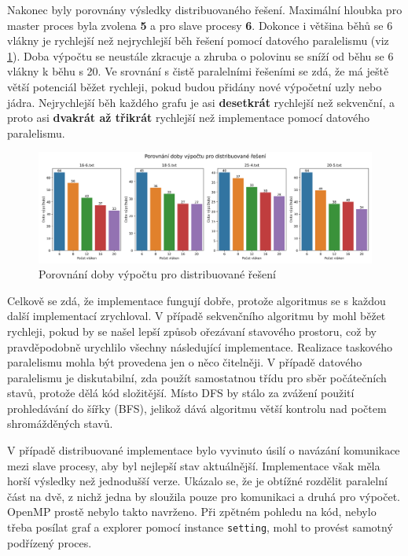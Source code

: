 Nakonec byly porovnány výsledky distribuovaného řešení.
Maximální hloubka pro master proces byla zvolena \textbf{5} a pro slave procesy \textbf{6}.
Dokonce i většina běhů se 6 vlákny je rychlejší než nejrychlejší běh řešení pomocí datového paralelismu (viz \ref{fig:distrib-graph.png}).
Doba výpočtu se neustále zkracuje a zhruba o polovinu se sníží od běhu se 6 vlákny k běhu s 20.
Ve srovnání s čistě paralelními řešeními se zdá, že má ještě větší potenciál běžet rychleji, pokud budou přidány nové výpočetní uzly nebo jádra.
Nejrychlejší běh každého grafu je asi \textbf{desetkrát} rychlejší než sekvenční, a proto asi \textbf{dvakrát až třikrát} rychlejší než implementace pomocí datového paralelismu.

\begin{figure}[!htbp]
\centerline{\includegraphics[scale=0.52]{report/images/distrib-graph.png}}
\caption{Porovnání doby výpočtu pro distribuované řešení}
\label{fig:distrib-graph.png}
\end{figure}
\FloatBarrier

Celkově se zdá, že implementace fungují dobře, protože algoritmus se s každou další implementací zrychloval.
V případě sekvenčního algoritmu by mohl běžet rychleji, pokud by se našel lepší způsob ořezávaní stavového prostoru, což by pravděpodobně urychlilo všechny následující implementace.
Realizace taskového paralelismu mohla být provedena jen o něco čitelněji.
V případě datového paralelismu je diskutabilní, zda použít samostatnou třídu pro sběr počátečních stavů, protože dělá kód složitější.
Místo DFS by stálo za zvážení použití prohledávání do šířky (BFS), jelikož dává algoritmu větší kontrolu nad počtem shromážděných stavů.

V případě distribuované implementace bylo vyvinuto úsilí o navázání komunikace mezi slave procesy, aby byl nejlepší stav aktuálnější.
Implementace však měla horší výsledky než jednodušší verze.
Ukázalo se, že je obtížné rozdělit paralelní část na dvě, z nichž jedna by sloužila pouze pro komunikaci a druhá pro výpočet.
OpenMP prostě nebylo takto navrženo.
Při zpětném pohledu na kód, nebylo třeba posílat graf a explorer pomocí instance \texttt{setting}, mohl to provést samotný podřízený proces.









